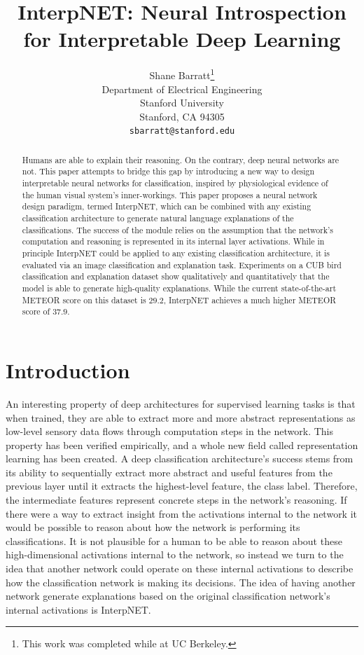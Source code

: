 \documentclass{article}
\title{InterpNET: Neural Introspection for Interpretable Deep Learning}
\author{
  Shane Barratt\thanks{This work was completed while at UC Berkeley.} \\
  Department of Electrical Engineering\\
  Stanford University \\
  Stanford, CA 94305 \\
  \texttt{sbarratt@stanford.edu} \\
}
\begin{document}

\maketitle

\begin{abstract}
Humans are able to explain their reasoning. On the contrary, deep neural networks are not. This paper attempts to bridge this gap by introducing a new way to design interpretable neural networks for classification, inspired by physiological evidence of the human visual system's inner-workings. This paper proposes a neural network design paradigm, termed InterpNET, which can be combined with any existing classification architecture to generate natural language explanations of the classifications. The success of the module relies on the assumption that the network's computation and reasoning is represented in its internal layer activations. While in principle InterpNET could be applied to any existing classification architecture, it is evaluated via an image classification and explanation task. Experiments on a CUB bird classification and explanation dataset show qualitatively and quantitatively that the model is able to generate high-quality explanations. While the current state-of-the-art METEOR score on this dataset is $29.2$, InterpNET achieves a much higher METEOR score of $37.9$.
\end{abstract}

\section{Introduction}
An interesting property of deep architectures for supervised learning tasks is that when trained, they are able to extract more and more abstract representations as low-level sensory data flows through computation steps in the network. This property has been verified empirically, and a whole new field called representation learning has been created. A deep classification architecture's success stems from its ability to sequentially extract more abstract and useful features from the previous layer until it extracts the highest-level feature, the class label. Therefore, the intermediate features represent concrete steps in the network's reasoning. If there were a way to extract insight from the activations internal to the network it would be possible to reason about how the network is performing its classifications. It is not plausible for a human to be able to reason about these high-dimensional activations internal to the network, so instead we turn to the idea that another network could operate on these internal activations to describe how the classification network is making its decisions. The idea of having another network generate explanations based on the original classification network's internal activations is InterpNET.
\end{document}

